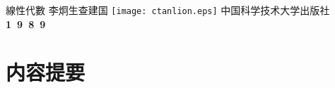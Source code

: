 
\pagecolor{titlegray}\afterpage{\pagecolor{white}\printwatermark}

\vfill
\begin{center}
{\maokai{}線性代數}
\vfill\fzqiti{}
李炯生\hspace{1\ccwd}查建国
\vfill
\texttt{[image: ctanlion.eps]}
\vfill\vspace*{-1cm}\fzfangguo{}
中国科学技术大学出版社\\[1mm]
\TeXGyreBonum\normalsize\textbf{1~9~8~9}
\end{center}

\clearpage

\chapter*{\fzydzhhei{}内容提要}

